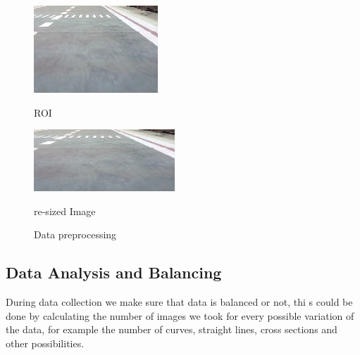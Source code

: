 \begin{enumerate}
\begin{figure}
\begin{minipage}[t]{0.3\linewidth}
	\includegraphics[width=\textwidth]{images/Learningprocess/img4.png}
	\caption[ROI]{ \left \newline ROI}
	\end{minipage}
		\begin{minipage}[t]{0.3\linewidth}
	\includegraphics[width=\textwidth]{images/Learningprocess/img2.png}
	\caption[resized Image]{\left \newline \center re-sized Image}
	\end{minipage}
 	\caption[Data preprocessing]{ \center Data preprocessing} \label{fig: Data preprocessing}%
  \end{figure}
\end{enumerate}
\subsection{Data Analysis and Balancing}
\hspace{2cm}During data collection we make sure that data is balanced or not, thi  s could be done by calculating the number of images we took for every possible variation of the data, for example the number of curves, straight lines, cross sections and other possibilities.


